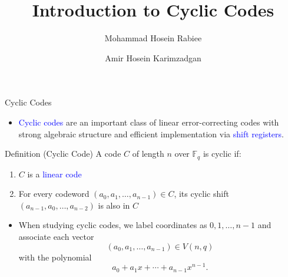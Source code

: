\documentclass[aspectratio=169,xcolor=dvipsnames]{beamer}
\title{Introduction to Cyclic Codes}
\author{
	Mohammad Hosein Rabiee
	\and
	Amir Hosein Karimzadgan \\
}
\institute
{
	Department of Computer Science and Statistics \\
	Faculty of Mathematics \\
	K. N. Toosi University of Technology
}
\date{}
\begin{document}
	
	\begin{frame}
		\titlepage
	\end{frame}
	
	\begin{frame}{Cyclic Codes}
		
		\begin{itemize}
			\item \textcolor{blue}{Cyclic codes} are an important class of linear error-correcting codes
			with strong algebraic structure and efficient implementation via \textcolor{blue}{shift registers}.
		\end{itemize}
		
		\vspace{0.6em}
		
		\begin{block}{Definition (Cyclic Code)}
			A code $C$ of length $n$ over $\mathbb{F}_q$ is \alert{cyclic} if:
			\begin{enumerate}
				\item $C$ is a \textcolor{blue}{linear code}
				\item For every codeword $(a_0,a_1,\dots,a_{n-1}) \in C$,  
				its cyclic shift $(a_{n-1},a_0,\dots,a_{n-2})$ is also in $C$
			\end{enumerate}
			
		\end{block}
		\begin{itemize}
			\item When studying cyclic codes, we label coordinates as
			$0,1,\ldots,n-1$ and associate each vector
			\[
			(a_0,a_1,\ldots,a_{n-1}) \in V(n,q)
			\]
			with the polynomial
			\[
			a_0 + a_1 x + \cdots + a_{n-1} x^{n-1}.
			\]
		\end{itemize}
		
	\end{frame}
	
\end{document}
